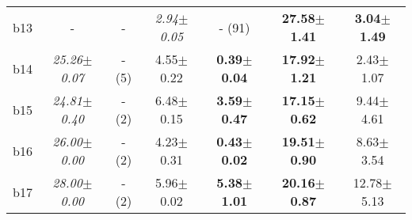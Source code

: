 \begin{longtable}{|l|c|c|c|c|c|c|}
\\
b13&- & -&\textit{2.94$\pm$0.05} & - (91)&\textbf{27.58$\pm$1.41} & \textbf{3.04$\pm$1.49}
\\
b14&\textit{25.26$\pm$0.07} & - (5)&4.55$\pm$0.22 & \textbf{0.39$\pm$0.04}&\textbf{17.92$\pm$1.21} & 2.43$\pm$1.07
\\
b15&\textit{24.81$\pm$0.40} & - (2)&6.48$\pm$0.15 & \textbf{3.59$\pm$0.47}&\textbf{17.15$\pm$0.62} & 9.44$\pm$4.61
\\
b16&\textit{26.00$\pm$0.00} & - (2)&4.23$\pm$0.31 & \textbf{0.43$\pm$0.02}&\textbf{19.51$\pm$0.90} & 8.63$\pm$3.54
\\
b17&\textit{28.00$\pm$0.00} & - (2)&5.96$\pm$0.02 & \textbf{5.38$\pm$1.01}&\textbf{20.16$\pm$0.87} & 12.78$\pm$5.13
\\
\hline
\end{longtable}
